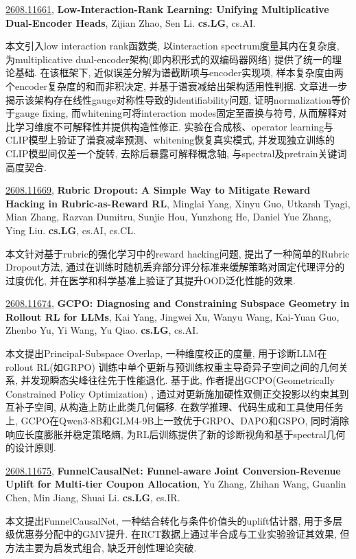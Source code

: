\documentclass[9pt, a4paper]{article}
\theoremstyle{plain}
\theoremstyle{definition}
\theoremstyle{remark}
\newcommand{\arxivwithtarget}[3]{\hypertarget{#1}{}\href{https://arxiv.org/abs/#1}{#1}, \textbf{\textcolor{arxivblue}{#2}}, #3. }
\begin{document}
\arxivwithtarget{2608.11661}{Low-Interaction-Rank Learning: Unifying Multiplicative Dual-Encoder Heads}{Zijian Zhao, Sen Li}\textbf{cs.LG}, cs.AI.

本文引入low interaction rank函数类, 以interaction spectrum度量其内在复杂度, 为multiplicative dual-encoder架构(即内积形式的双编码器网络) 提供了统一的理论基础. 在该框架下, 近似误差分解为谱截断项与encoder实现项, 样本复杂度由两个encoder复杂度的和而非积决定, 并基于谱衰减给出架构适用性判据. 文章进一步揭示该架构存在线性gauge对称性导致的identifiability问题, 证明normalization等价于gauge fixing, 而whitening可将interaction modes固定至置换与符号, 从而解释对比学习维度不可解释性并提供构造性修正. 实验在合成核、operator learning与CLIP模型上验证了谱衰减率预测、whitening恢复真实模式, 并发现独立训练的CLIP模型间仅差一个旋转, 去除后暴露可解释概念轴, 与spectral及pretrain关键词高度契合.


\arxivwithtarget{2608.11669}{Rubric Dropout: A Simple Way to Mitigate Reward Hacking in Rubric-as-Reward RL}{Minglai Yang, Xinyu Guo, Utkarsh Tyagi, Mian Zhang, Razvan Dumitru, Sunjie Hou, Yunzhong He, Daniel Yue Zhang, Ying Liu}\textbf{cs.LG}, cs.AI, cs.CL.

本文针对基于rubric的强化学习中的reward hacking问题, 提出了一种简单的Rubric Dropout方法, 通过在训练时随机丢弃部分评分标准来缓解策略对固定代理评分的过度优化, 并在医学和科学基准上验证了其提升OOD泛化性能的效果.


\arxivwithtarget{2608.11674}{GCPO: Diagnosing and Constraining Subspace Geometry in Rollout RL for LLMs}{Kai Yang, Jingwei Xu, Wanyu Wang, Kai-Yuan Guo, Zhenbo Yu, Yi Wang, Yu Qiao}\textbf{cs.LG}, cs.AI.

本文提出Principal-Subspace Overlap, 一种维度校正的度量, 用于诊断LLM在rollout RL(如GRPO) 训练中单个更新与预训练权重主导奇异子空间之间的几何关系, 并发现瞬态尖峰往往先于性能退化. 基于此, 作者提出GCPO(Geometrically Constrained Policy Optimization) , 通过对更新施加硬性双侧正交投影以约束其到互补子空间, 从构造上防止此类几何偏移. 在数学推理、代码生成和工具使用任务上, GCPO在Qwen3-8B和GLM4-9B上一致优于GRPO、DAPO和GSPO, 同时消除响应长度膨胀并稳定策略熵, 为RL后训练提供了新的诊断视角和基于spectral几何的设计原则.


\arxivwithtarget{2608.11675}{FunnelCausalNet: Funnel-aware Joint Conversion-Revenue Uplift for Multi-tier Coupon Allocation}{Yu Zhang, Zhihan Wang, Guanlin Chen, Min Jiang, Shuai Li}\textbf{cs.LG}, cs.IR.

本文提出FunnelCausalNet, 一种结合转化与条件价值头的uplift估计器, 用于多层级优惠券分配中的GMV提升. 在RCT数据上通过半合成与工业实验验证其效果, 但方法主要为启发式组合, 缺乏开创性理论突破.
\end{document}
